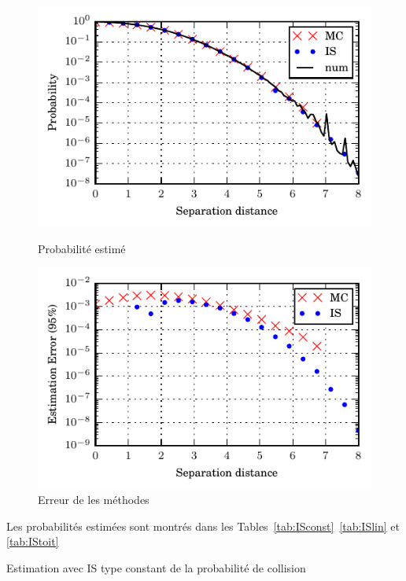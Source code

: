 \documentclass[a4paper, 12pt,twoside]{article}
\numberwithin{equation}{subsection}
\newlength{\mylength}
\begin{document}
	\begin{figure}[htbp]
		\centering
		\begin{minipage}[b]{\mylength}
			\includegraphics[width=\textwidth]{Images/Script_8_ISmc_1}
			\caption{Probabilité estimé}
			\label{fig:ISmc}
		\end{minipage}
		\hfill
		\begin{minipage}[b]{\mylength}
			\includegraphics[width=\textwidth]{Images/Script_8_ISmc_2}
			\caption{Erreur de les méthodes}
			\label{fig:ISmcErr}
		\end{minipage}
	\end{figure}
	
	Les probabilités estimées sont montrés dans les Tables~\ref{tab:ISconst}~\ref{tab:ISlin} et \ref{tab:IStoit}
	
	\begin{table}[htbp]
		\begin{center}
		\end{center}
		\caption{Estimation avec IS type constant de la probabilité de collision}
		\label{tab:ISconst}
	\end{table}
	
\end{document}
